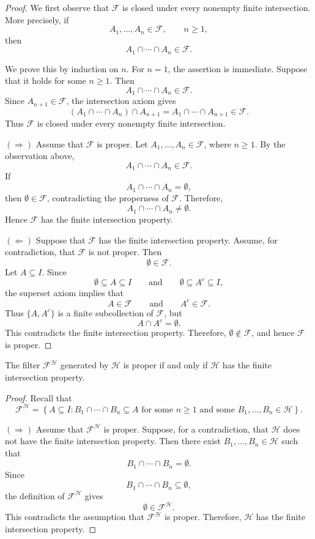 {\begin{proof}
We first observe that \(\mathcal{F}\) is closed under every nonempty
finite intersection. More precisely, if
\[
A_1,\ldots,A_n\in\mathcal{F},
\qquad n\geq 1,
\]
then
\[
A_1\cap\cdots\cap A_n\in\mathcal{F}.
\]

We prove this by induction on \(n\). For \(n=1\), the assertion is
immediate. Suppose that it holds for some \(n\geq 1\). Then
\[
A_1\cap\cdots\cap A_n\in\mathcal{F}.
\]
Since \(A_{n+1}\in\mathcal{F}\), the intersection axiom gives
\[
(A_1\cap\cdots\cap A_n)\cap A_{n+1}
=
A_1\cap\cdots\cap A_{n+1}
\in\mathcal{F}.
\]
Thus \(\mathcal{F}\) is closed under every nonempty finite intersection.

\noindent\((\Rightarrow)\)
Assume that \(\mathcal{F}\) is proper. Let
\(A_1,\ldots,A_n\in\mathcal{F}\), where \(n\geq 1\). By the observation
above,
\[
A_1\cap\cdots\cap A_n\in\mathcal{F}.
\]
If
\[
A_1\cap\cdots\cap A_n=\emptyset,
\]
then \(\emptyset\in\mathcal{F}\), contradicting the properness of
\(\mathcal{F}\). Therefore,
\[
A_1\cap\cdots\cap A_n\neq\emptyset.
\]
Hence \(\mathcal{F}\) has the finite intersection property.

\noindent\((\Leftarrow)\)
Suppose that \(\mathcal{F}\) has the finite intersection property.
Assume, for contradiction, that \(\mathcal{F}\) is not proper. Then
\[
\emptyset\in\mathcal{F}.
\]
Let \(A\subseteq I\). Since
\[
\emptyset\subseteq A\subseteq I
\qquad\text{and}\qquad
\emptyset\subseteq A^c\subseteq I,
\]
the superset axiom implies that
\[
A\in\mathcal{F}
\qquad\text{and}\qquad
A^c\in\mathcal{F}.
\]
Thus \(\{A,A^c\}\) is a finite subcollection of \(\mathcal{F}\), but
\[
A\cap A^c=\emptyset.
\]
This contradicts the finite intersection property. Therefore,
\(\emptyset\notin\mathcal{F}\), and hence \(\mathcal{F}\) is proper.
\end{proof}

\begin{prop}
The filter \(\mathcal{F}^{\mathcal{H}}\) generated by \(\mathcal{H}\) is
proper if and only if \(\mathcal{H}\) has the finite intersection property.
\end{prop}

\begin{proof}
Recall that
\[
\mathcal{F}^{\mathcal{H}}
=
\left\{
A \subseteq I :
B_1 \cap \cdots \cap B_n \subseteq A
\text{ for some } n \geq 1
\text{ and some } B_1,\ldots,B_n \in \mathcal{H}
\right\}.
\]

\noindent\((\Rightarrow)\)
Assume that \(\mathcal{F}^{\mathcal{H}}\) is proper. Suppose, for a
contradiction, that \(\mathcal{H}\) does not have the finite intersection
property. Then there exist \(B_1,\ldots,B_n \in \mathcal{H}\) such that
\[
B_1 \cap \cdots \cap B_n = \emptyset.
\]
Since
\[
B_1 \cap \cdots \cap B_n \subseteq \emptyset,
\]
the definition of \(\mathcal{F}^{\mathcal{H}}\) gives
\[
\emptyset \in \mathcal{F}^{\mathcal{H}}.
\]
This contradicts the assumption that
\(\mathcal{F}^{\mathcal{H}}\) is proper. Therefore,
\(\mathcal{H}\) has the finite intersection property.


\end{proof}}
